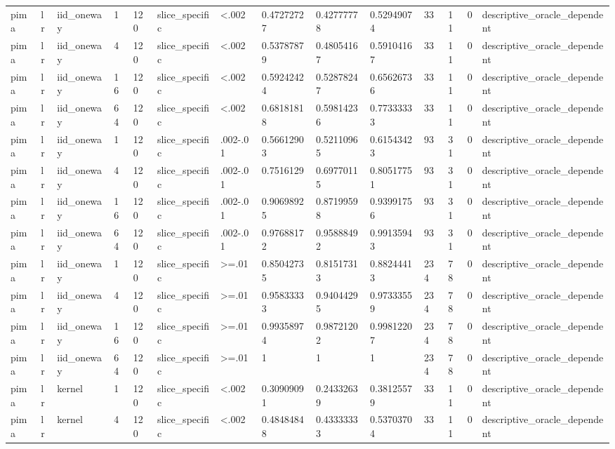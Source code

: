 \begin{tabular}{llllllllllllll}
pima & lr & iid\_oneway & 1 & 120 & slice\_specific & <.002 & 0.47272727 & 0.42777778 & 0.52949074 & 33 & 11 & 0 & descriptive\_oracle\_dependent \\
pima & lr & iid\_oneway & 4 & 120 & slice\_specific & <.002 & 0.53787879 & 0.48054167 & 0.59104167 & 33 & 11 & 0 & descriptive\_oracle\_dependent \\
pima & lr & iid\_oneway & 16 & 120 & slice\_specific & <.002 & 0.59242424 & 0.52878247 & 0.65626736 & 33 & 11 & 0 & descriptive\_oracle\_dependent \\
pima & lr & iid\_oneway & 64 & 120 & slice\_specific & <.002 & 0.68181818 & 0.59814236 & 0.77333333 & 33 & 11 & 0 & descriptive\_oracle\_dependent \\
pima & lr & iid\_oneway & 1 & 120 & slice\_specific & .002-.01 & 0.56612903 & 0.52110965 & 0.61543423 & 93 & 31 & 0 & descriptive\_oracle\_dependent \\
pima & lr & iid\_oneway & 4 & 120 & slice\_specific & .002-.01 & 0.7516129 & 0.69770115 & 0.80517751 & 93 & 31 & 0 & descriptive\_oracle\_dependent \\
pima & lr & iid\_oneway & 16 & 120 & slice\_specific & .002-.01 & 0.90698925 & 0.87199598 & 0.93991756 & 93 & 31 & 0 & descriptive\_oracle\_dependent \\
pima & lr & iid\_oneway & 64 & 120 & slice\_specific & .002-.01 & 0.97688172 & 0.95888492 & 0.99135943 & 93 & 31 & 0 & descriptive\_oracle\_dependent \\
pima & lr & iid\_oneway & 1 & 120 & slice\_specific & >=.01 & 0.85042735 & 0.81517313 & 0.88244413 & 234 & 78 & 0 & descriptive\_oracle\_dependent \\
pima & lr & iid\_oneway & 4 & 120 & slice\_specific & >=.01 & 0.95833333 & 0.94044295 & 0.97333559 & 234 & 78 & 0 & descriptive\_oracle\_dependent \\
pima & lr & iid\_oneway & 16 & 120 & slice\_specific & >=.01 & 0.99358974 & 0.98721202 & 0.99812207 & 234 & 78 & 0 & descriptive\_oracle\_dependent \\
pima & lr & iid\_oneway & 64 & 120 & slice\_specific & >=.01 & 1 & 1 & 1 & 234 & 78 & 0 & descriptive\_oracle\_dependent \\
pima & lr & kernel & 1 & 120 & slice\_specific & <.002 & 0.30909091 & 0.24332639 & 0.38125579 & 33 & 11 & 0 & descriptive\_oracle\_dependent \\
pima & lr & kernel & 4 & 120 & slice\_specific & <.002 & 0.48484848 & 0.43333333 & 0.53703704 & 33 & 11 & 0 & descriptive\_oracle\_dependent \\

\end{tabular}
